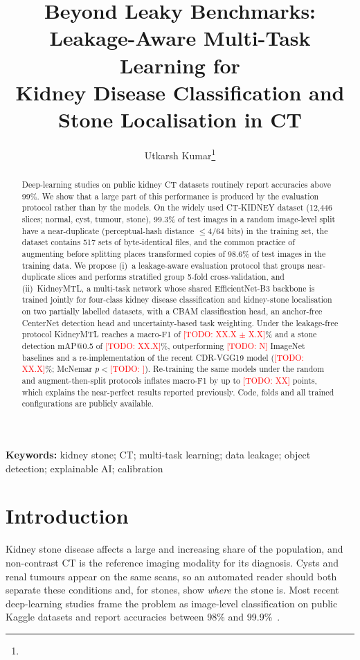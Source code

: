 \documentclass[11pt]{article}
\title{Beyond Leaky Benchmarks: Leakage-Aware Multi-Task Learning for\\
Kidney Disease Classification and Stone Localisation in CT}
\author{Utkarsh Kumar\thanks{\todo{affiliation, e-mail}}}
\date{}
\newcommand{\todo}[1]{\textcolor{red}{[TODO: #1]}}
\begin{document}
\maketitle

\begin{abstract}
Deep-learning studies on public kidney CT datasets routinely report accuracies above 99\%. We show that a
large part of this performance is produced by the evaluation protocol rather than by the models. On the
widely used CT-KIDNEY dataset (12,446 slices; normal, cyst, tumour, stone), 99.3\% of test images in a random
image-level split have a near-duplicate (perceptual-hash distance $\le$4/64 bits) in the training set, the
dataset contains 517 sets of byte-identical files, and the common practice of augmenting before splitting
places transformed copies of 98.6\% of test images in the training data. We propose (i)~a leakage-aware
evaluation protocol that groups near-duplicate slices and performs stratified group 5-fold cross-validation,
and (ii)~KidneyMTL, a multi-task network whose shared EfficientNet-B3 backbone is trained jointly for
four-class kidney disease classification and kidney-stone localisation on two partially labelled datasets,
with a CBAM classification head, an anchor-free CenterNet detection head and uncertainty-based task weighting.
Under the leakage-free protocol KidneyMTL reaches a macro-F1 of \todo{XX.X $\pm$ X.X}\% and a stone
detection mAP@0.5 of \todo{XX.X}\%, outperforming \todo{N} ImageNet baselines and a re-implementation of the
recent CDR-VGG19 model (\todo{XX.X}\%; McNemar $p<$\todo{}). Re-training the same models under the random and
augment-then-split protocols inflates macro-F1 by up to \todo{XX} points, which explains the near-perfect
results reported previously. Code, folds and all trained configurations are publicly available.
\end{abstract}

\noindent\textbf{Keywords:} kidney stone; CT; multi-task learning; data leakage; object detection;
explainable AI; calibration

\section{Introduction}
Kidney stone disease affects a large and increasing share of the population, and non-contrast CT is the
reference imaging modality for its diagnosis. Cysts and renal tumours appear on the same scans, so an
automated reader should both separate these conditions and, for stones, show \emph{where} the stone is.
Most recent deep-learning studies frame the problem as image-level classification on public Kaggle datasets
and report accuracies between 98\% and 99.9\%~\citep{islam2022vision,devi2025cdr,yildirim2021deep}.
\end{document}
